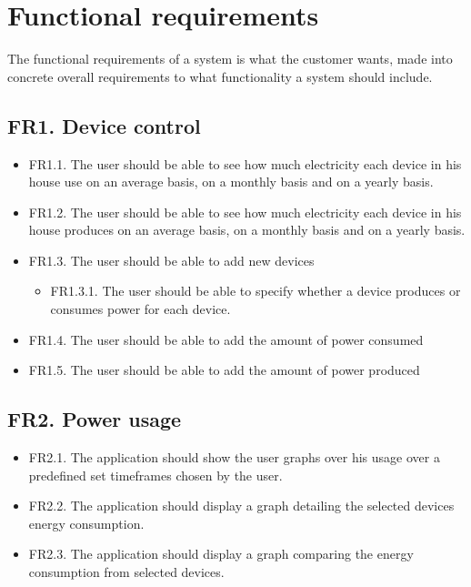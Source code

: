 \newpage
\section{Functional requirements}
The functional requirements of a system is what the customer wants, made into concrete overall requirements to what functionality a system should include. 

\subsection*{FR1. Device control}
\begin{itemize}
\item FR1.1. The user should be able to see how much electricity each device in his house use on an average basis, on a monthly basis and on a yearly basis.
\item FR1.2. The user should be able to see how much electricity each device in his house produces on an average basis, on a monthly basis and on a yearly basis.
\item FR1.3. The user should be able to add new devices 
\begin{itemize}
\item FR1.3.1. The user should be able to specify whether a device produces or consumes power for each device.
\end{itemize}
\item FR1.4. The user should be able to add the amount of power consumed
\item FR1.5. The user should be able to add the amount of power produced
\end{itemize}

\subsection*{FR2. Power usage}
\begin{itemize}
\item FR2.1. The application should show the user graphs over his usage over a predefined set timeframes chosen by the user.
\item FR2.2. The application should display a graph detailing the selected devices energy consumption.
\item FR2.3. The application should display a graph comparing the energy consumption from selected devices.
\end{itemize}

